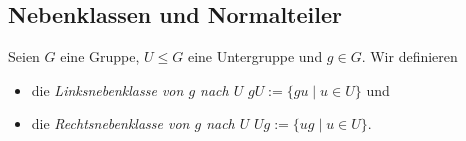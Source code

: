 
\subsection{Nebenklassen und Normalteiler}

\begin{definition}
    Seien $G$ eine Gruppe, $U \le G$ eine Untergruppe und $g \in G$. Wir definieren 
    \begin{itemize}
        \item die \emph{Linksnebenklasse von $g$ nach $U$} $gU := \{gu \mid u \in U\}$ und
        \item die \emph{Rechtsnebenklasse von $g$ nach $U$} $Ug := \{ug \mid u \in U\}$.
    \end{itemize}
\end{definition}

